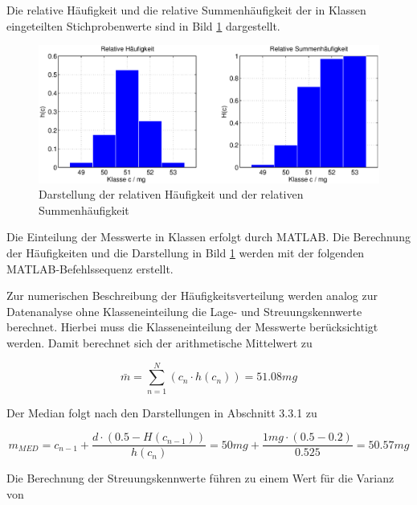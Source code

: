 \noindent Die relative H\"{a}ufigkeit und die relative Summenh\"{a}ufigkeit der in Klassen eingeteilten Stichprobenwerte sind in Bild \ref{fig:DefinitionSchiefeBoxPlot2} dargestellt.

\noindent 
\begin{figure}[H]
  \centerline{\includegraphics[width=1\textwidth]{Kapitel3/Bilder/image15}}
  \caption{Darstellung der relativen H\"{a}ufigkeit und der relativen Summenh\"{a}ufigkeit}
  \label{fig:DefinitionSchiefeBoxPlot2}
\end{figure}

\noindent Die Einteilung der Messwerte in Klassen erfolgt durch MATLAB. Die Berechnung der H\"{a}ufigkeiten und die Darstellung in Bild \ref{fig:DefinitionSchiefeBoxPlot2} werden mit der folgenden MATLAB-Befehlssequenz erstellt.



\noindent Zur numerischen Beschreibung der H\"{a}ufigkeitsverteilung werden analog zur Datenanalyse ohne Klasseneinteilung die Lage- und Streuungskennwerte berechnet. Hierbei muss die Klasseneinteilung der Messwerte ber\"{u}cksichtigt werden. Damit berechnet sich der arithmetische Mittelwert zu

\begin{equation}\label{eq:threeseventyfive}
\bar{m}=\displaystyle\sum _{n=1}^{N}\left(c_{n} \cdot h (c_{n})\right) =51.08 mg
\end{equation}

\noindent Der Median folgt nach den Darstellungen in Abschnitt 3.3.1 zu

\begin{equation}\label{eq:threeseventysix}
m_{MED} =c_{n-1} +\dfrac{d\cdot \left(0.5-H(c_{n-1} )\right)}{h\left(c_{n} \right)} =50 mg+\dfrac{1 mg\cdot (0.5-0.2)}{0.525} = 50.57 mg
\end{equation}

\noindent Die Berechnung der Streuungskennwerte f\"{u}hren zu einem Wert f\"{u}r die Varianz von


